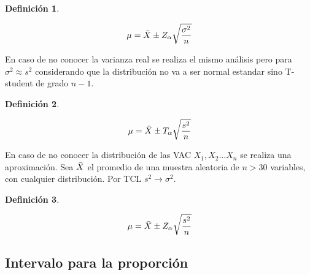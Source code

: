 \documentclass[a5paper,12pt,twoside]{book}
\newtheorem{defn}{{Definición}}[chapter]
\begin{document}
\begin{mdframed}[style=MyFrame1]
    \begin{defn}
    \end{defn}
    \begin{equation*}
        \mu = \bar{X} \pm Z_\alpha \sqrt{\frac{\sigma^2}{n}}
    \end{equation*}
\end{mdframed}

En caso de no conocer la varianza real se realiza el mismo análisis pero para $\sigma^2 \approx s^2$ considerando que la distribución no va a ser normal estandar sino T-student de grado $n-1$.

\begin{mdframed}[style=MyFrame1]
    \begin{defn}
    \end{defn}
    \begin{equation*}
        \mu = \bar{X} \pm T_\alpha \sqrt{\frac{s^2}{n}}
    \end{equation*}
\end{mdframed}

En caso de no conocer la distribución de las VAC $X_1, X_2 \dots X_n$ se realiza una aproximación.
Sea $\bar{X}$ el promedio de una muestra aleatoria de $n>30$ variables, con cualquier distribución.
Por TCL $s^2 \to \sigma^2$.

\begin{mdframed}[style=MyFrame1]
    \begin{defn}
    \end{defn}
    \begin{equation*}
        \mu = \bar{X} \pm Z_\alpha \sqrt{\frac{s^2}{n}}
    \end{equation*}
\end{mdframed}


\subsection{Intervalo para la proporción}
\end{document}
